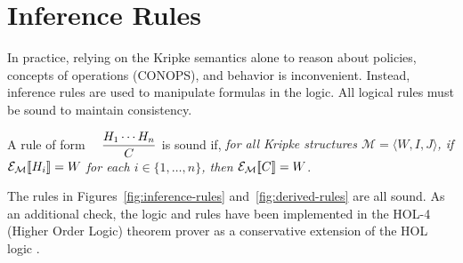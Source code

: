 \section{Inference Rules}
\label{sec:inference rules}

In practice, relying on the Kripke semantics alone to reason about
policies, concepts of operations (CONOPS), and behavior is
inconvenient. Instead, inference rules are used to manipulate formulas
in the logic. All logical rules must be sound to maintain consistency.

\begin{definition}
  A rule of form $\textit{}\quad {\displaystyle \frac{H_1 \cdots H_n}{C}}$ is sound if,
  \textsl{for all Kripke structures $\mathcal{M} = \langle W, I, J
    \rangle$, if $\mathcal{E}_{\mathcal{M}}[\![H_i]\!]=W$ for each $i \in \{1,\ldots, n\}$, then
    $\mathcal{E}_{\mathcal{M}}[\![C]\!] = W$}.
\end{definition}

The rules in Figures~\ref{fig:inference-rules}
and~\ref{fig:derived-rules} are all sound. As an additional check, the
logic and rules have been implemented in the HOL-4 (Higher Order
Logic) theorem prover as a conservative extension of the HOL logic
\cite{HOL}.





